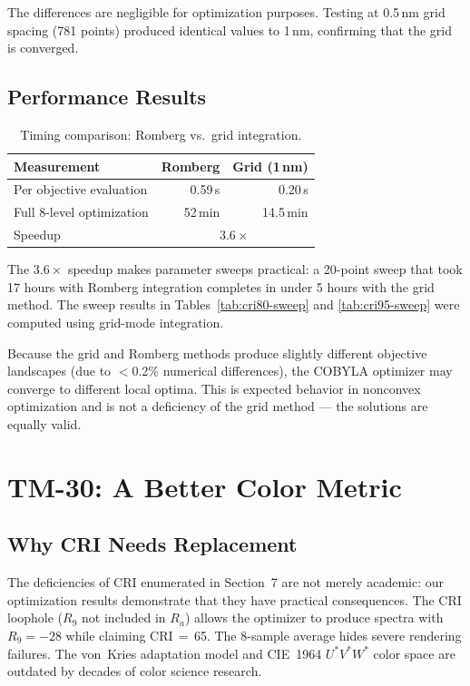 \documentclass[11pt]{article}
\begin{document}
The differences are negligible for optimization purposes.  Testing at
0.5\,nm grid spacing (781 points) produced identical values to 1\,nm,
confirming that the grid is converged.

\subsection{Performance Results}

\begin{table}[H]
\centering
\caption{Timing comparison: Romberg vs.\ grid integration.}
\label{tab:grid-timing}
\begin{tabular}{lrr}
\toprule
Measurement & Romberg & Grid (1\,nm) \\
\midrule
Per objective evaluation & 0.59\,s & 0.20\,s \\
Full 8-level optimization & 52\,min & 14.5\,min \\
Speedup & \multicolumn{2}{c}{$\mathbf{3.6\times}$} \\
\bottomrule
\end{tabular}
\end{table}

The $3.6\times$ speedup makes parameter sweeps practical: a 20-point
sweep that took 17 hours with Romberg integration completes in under
5 hours with the grid method.  The sweep results in
Tables~\ref{tab:cri80-sweep} and \ref{tab:cri95-sweep} were computed
using grid-mode integration.

Because the grid and Romberg methods produce slightly different objective
landscapes (due to $<$0.2\% numerical differences), the COBYLA optimizer
may converge to different local optima.  This is expected behavior in
nonconvex optimization and is not a deficiency of the grid method ---
the solutions are equally valid.

\section{TM-30: A Better Color Metric}
\label{sec:tm30}

\subsection{Why CRI Needs Replacement}

The deficiencies of CRI enumerated in Section~7 are not merely academic:
our optimization results demonstrate that they have practical consequences.
The CRI loophole ($R_9$ not included in $R_a$) allows the optimizer to
produce spectra with $R_9 = -28$ while claiming CRI\,$=$\,65.  The
8-sample average hides severe rendering failures.  The von~Kries
adaptation model and CIE~1964 $U^*V^*W^*$ color space are outdated by
decades of color science research.
\end{document}
